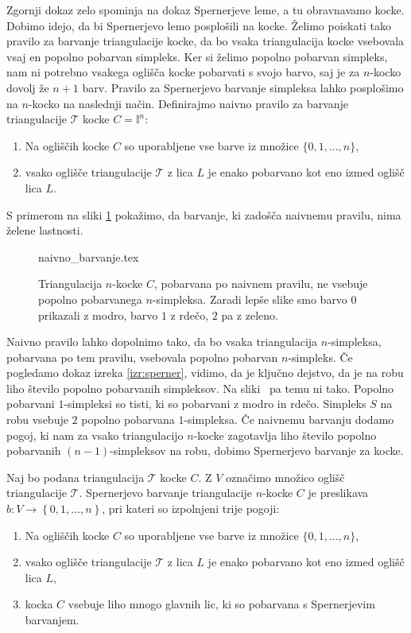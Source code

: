 \documentclass[mat1]{fmfdelo}
\newcommand{\I}{\mathbb I}
\newcommand{\0}{0}
\newcommand{\pT}{\mathcal T}
\begin{document}
Zgornji dokaz zelo spominja na dokaz Spernerjeve leme, a tu obravnavamo kocke. Dobimo idejo, da bi Spernerjevo lemo posplošili na kocke. Želimo poiskati tako pravilo za barvanje triangulacije kocke, da bo vsaka triangulacija kocke vsebovala vsaj en popolno pobarvan simpleks. Ker si želimo popolno pobarvan simpleks, nam ni potrebno vsakega oglišča kocke pobarvati s svojo barvo, saj je za $n$-kocko dovolj že $n+1$ barv.  Pravilo za Spernerjevo barvanje simpleksa lahko posplošimo na $n$-kocko na naslednji način.
Definirajmo naivno pravilo za barvanje triangulacije $\pT$ kocke $C=\I^n$:
\begin{enumerate}
\item Na ogliščih kocke $C$ so uporabljene vse barve iz množice $\{0, 1, \dots, n \}$,
\item vsako oglišče triangulacije $\pT$ z lica $L$ je enako pobarvano kot eno izmed oglišč lica $L$.
\end{enumerate}
S primerom na sliki \ref{fig:ni-pop} pokažimo, da barvanje, ki zadošča naivnemu pravilu, nima želene lastnosti.
\begin{figure}[h!]
	\centering
	{naivno_barvanje.tex}
	\caption{Triangulacija $n$-kocke $C$, pobarvana po naivnem pravilu, ne vsebuje popolno pobarvanega $n$-simpleksa. Zaradi lepše slike smo barvo $0$ prikazali z modro, barvo $1$ z rdečo, $2$ pa z zeleno.}\label{fig:ni-pop}
\end{figure}
Naivno pravilo lahko dopolnimo tako, da bo vsaka triangulacija $n$-simpleksa, pobarvana po tem pravilu, vsebovala popolno pobarvan $n$-simpleks. Če pogledamo dokaz izreka \ref{izr:sperner}, vidimo, da je ključno dejstvo, da je na robu liho število popolno pobarvanih simpleksov. Na sliki~\label{fig:ni-pop} pa temu ni tako. Popolno pobarvani $1$-simpleksi so tisti, ki so pobarvani z modro in rdečo. Simpleks $S$ na robu vsebuje $2$ popolno pobarvana $1$-simpleksa. Če naivnemu barvanju dodamo pogoj, ki nam za vsako triangulacijo $n$-kocke zagotavlja liho število popolno pobarvanih $(n-1)$-simpleksov na robu, dobimo Spernerjevo barvanje za kocke.
\begin{definicija}\label{def:cubsperner}
Naj bo podana triangulacija $\pT$ kocke $C$. Z $V$ označimo množico oglišč triangulacije $\pT$. Spernerjevo barvanje triangulacije $n$-kocke $C$ je preslikava $b : V \to \left \{ 0, 1, \dots, n \right \}$, pri kateri so izpolnjeni trije pogoji:
\begin{enumerate}
\item Na ogliščih kocke $C$ so uporabljene vse barve iz množice $\{0, 1, \dots, n \}$, \label{sperner1}
\item vsako oglišče triangulacije $\pT$ z lica $L$ je enako pobarvano kot eno izmed oglišč lica $L$,\label{sperner2}
\item kocka $C$ vsebuje liho mnogo glavnih lic, ki so pobarvana s Spernerjevim barvanjem.\label{sperner3}
\end{enumerate}
\end{definicija}
\end{document}
